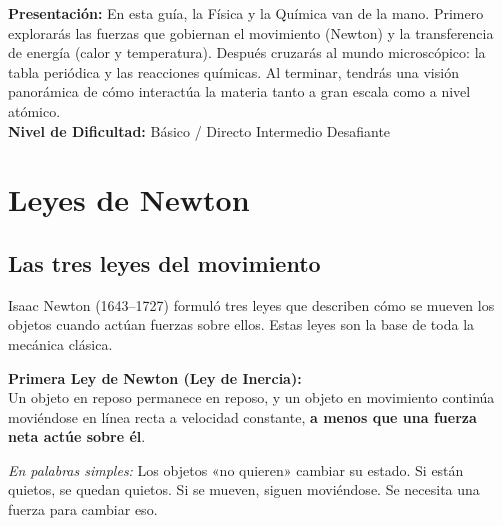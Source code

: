\documentclass[12pt, a4paper]{article}
\begin{document}


\vspace{4pt}
\begin{cuadroinfo}
\small
\textbf{Presentación:} En esta guía, la Física y la Química van de la mano. Primero explorarás las fuerzas que gobiernan el movimiento (Newton) y la transferencia de energía (calor y temperatura). Después cruzarás al mundo microscópico: la tabla periódica y las reacciones químicas. Al terminar, tendrás una visión panorámica de cómo interactúa la materia tanto a gran escala como a nivel atómico.
\\[4pt]
\textbf{Nivel de Dificultad:}\quad
\facil{} Básico / Directo \quad
\medio{} Intermedio \quad
\dificil{} Desafiante
\end{cuadroinfo}

\vspace{8pt}

\section{Leyes de Newton}

\subsection{Las tres leyes del movimiento}

Isaac Newton (1643--1727) formuló tres leyes que describen cómo se mueven los objetos cuando actúan fuerzas sobre ellos. Estas leyes son la base de toda la mecánica clásica.

\begin{cuadroteoria}
\textbf{Primera Ley de Newton (Ley de Inercia):}\\
Un objeto en reposo permanece en reposo, y un objeto en movimiento continúa moviéndose en línea recta a velocidad constante, \textbf{a menos que una fuerza neta actúe sobre él}.

\textit{En palabras simples:} Los objetos «no quieren» cambiar su estado. Si están quietos, se quedan quietos. Si se mueven, siguen moviéndose. Se necesita una fuerza para cambiar eso.
\end{cuadroteoria}
\end{document}
